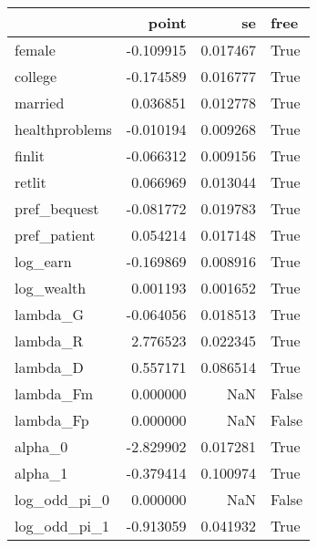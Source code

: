 \begin{tabular}{lrrl}
\toprule
{} &     point &        se &   free \\
\midrule
female         & -0.109915 &  0.017467 &   True \\
college        & -0.174589 &  0.016777 &   True \\
married        &  0.036851 &  0.012778 &   True \\
healthproblems & -0.010194 &  0.009268 &   True \\
finlit         & -0.066312 &  0.009156 &   True \\
retlit         &  0.066969 &  0.013044 &   True \\
pref\_bequest   & -0.081772 &  0.019783 &   True \\
pref\_patient   &  0.054214 &  0.017148 &   True \\
log\_earn       & -0.169869 &  0.008916 &   True \\
log\_wealth     &  0.001193 &  0.001652 &   True \\
lambda\_G       & -0.064056 &  0.018513 &   True \\
lambda\_R       &  2.776523 &  0.022345 &   True \\
lambda\_D       &  0.557171 &  0.086514 &   True \\
lambda\_Fm      &  0.000000 &       NaN &  False \\
lambda\_Fp      &  0.000000 &       NaN &  False \\
alpha\_0        & -2.829902 &  0.017281 &   True \\
alpha\_1        & -0.379414 &  0.100974 &   True \\
log\_odd\_pi\_0   &  0.000000 &       NaN &  False \\
log\_odd\_pi\_1   & -0.913059 &  0.041932 &   True \\
\bottomrule
\end{tabular}
